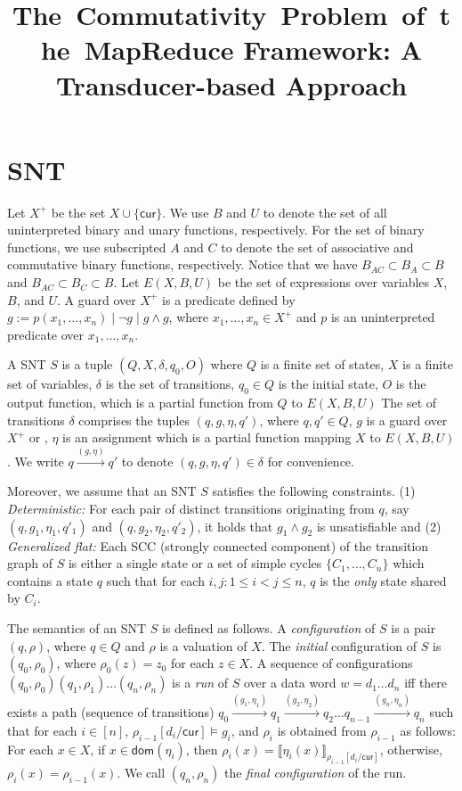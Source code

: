 \documentclass[runningheads,a4paper]{llncs}
\title{The~Commutativity~Problem~of~the~MapReduce Framework: A Transducer-based Approach}
\author{}
\institute{}
\newcommand{\eval}[2]{\llbracket#1\rrbracket_{#2}}
\newcommand\cur{\mathsf{cur}}
\newcommand\dom{\mathsf{dom}}
\begin{document}
\maketitle

\section{SNT}
Let $X^+$ be the set $X\cup \{ \cur \}$.
We use $B$ and $U$ to denote the set of all uninterpreted binary and unary functions, respectively. For the set of binary functions, we use subscripted $A$ and $C$ to denote the set of associative and commutative binary functions, respectively. Notice that we have $B_{AC}\subset B_A \subset B$ and $B_{AC}\subset B_C \subset B$.
Let $E(X, B, U)$ be the set of expressions over variables $X$, $B$, and $U$.
A guard over $X^+$ is a predicate defined by $g:= p(x_1,\ldots,x_n) \mid \neg g \mid g\wedge g$, where $x_1,\ldots,x_n\in X^+$ and $p$ is an uninterpreted predicate over $x_1,\ldots,x_n$. 

A SNT $S$ is a tuple $(Q, X, \delta, q_0, O)$ where $Q$ is a finite set of states, $X$ is a finite set of variables, $\delta$ is the set of transitions, $q_0 \in Q$ is the initial state, $O$ is the output function, which is a partial function from $Q$ to $E(X,B, U)$
The set of transitions $\delta$ comprises the tuples $(q, g, \eta, q')$, where $q,q'\in Q$, $g$ is a guard over $X^+$ or , $\eta$ is an assignment which is a partial function mapping $X$  to $E(X,B, U)$. We write $q \xrightarrow{(g,\eta)} q'$ to denote $(q,g,\eta,q') \in \delta$ for convenience. 

Moreover, we assume that an SNT $S$ satisfies the following constraints. (1) \emph{Deterministic:} For each pair of distinct transitions originating from $q$, say $(q, g_1, \eta_1,q'_1)$ and $(q, g_2,\eta_2,q'_2)$, it holds that $g_1 \wedge g_2$ is unsatisfiable and (2) \emph{Generalized flat:} Each SCC (strongly connected component) of the transition graph of $S$ is either a single state or a set of simple cycles $\{C_1,\dots, C_n\}$ which contains a state $q$ such that for each $i,j: 1 \le i < j \le n$, $q$ is the \emph{only} state shared by $C_i$.

The semantics of an SNT $S$  is defined as follows. A \emph{configuration} of $S$ is a pair $(q,\rho)$, where $q \in Q$ and $\rho$ is a valuation of $X$. The \emph{initial} configuration of $S$ is $(q_0,\rho_0)$, where $\rho_0(z)=z_0$ for each $z \in X$.
A sequence of configurations $(q_0,\rho_0)(q_1,\rho_1)\ldots(q_n,\rho_n)$ is
a \emph{run} of $S$ over a data word $w=d_1 \dots d_n$ iff there exists a path (sequence of transitions) $q_0 \xrightarrow{(g_1,\eta_1)} q_1 \xrightarrow{(g_2,\eta_2)} q_2 \dots q_{n-1} \xrightarrow{(g_n, \eta_n)} q_n$ such that for each $i \in [n]$, $\rho_{i-1}[d_i/\cur] \models g_i$, and $\rho_i$ is obtained from $\rho_{i-1}$ as follows: For each $x \in X$, if $x \in \dom(\eta_i)$, then $\rho_i(x)=\eval{\eta_i(x)}{\rho_{i-1}[d_i/\cur]}$, otherwise, $\rho_i(x)=\rho_{i-1}(x)$.
We call $(q_n,\rho_n)$ the \emph{final configuration} of the run. %
\end{document}
